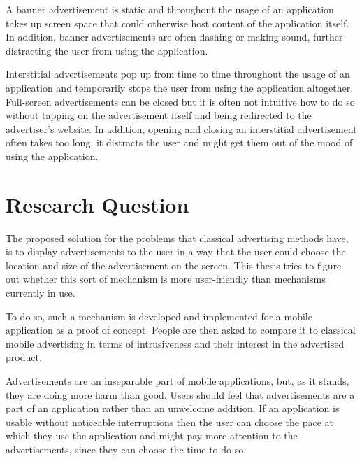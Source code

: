 A banner advertisement is static and throughout the usage of an application takes up screen space that could otherwise host content of the application itself. In addition, banner advertisements are often flashing or making sound, further distracting the user from using the application.

Interstitial advertisements pop up from time to time throughout the usage of an application and temporarily stops the user from using the application altogether. Full-screen advertisements can be closed but it is often not intuitive how to do so without tapping on the advertisement itself and being redirected to the advertiser's website. In addition, opening and closing an interstitial advertisement often takes too long. it distracts the user and might get them out of the mood of using the application.


\section{Research Question}

The proposed solution for the problems that classical advertising methods have, is to display advertisements to the user in a way that the user could choose the location and size of the advertisement on the screen. This thesis tries to figure out whether this sort of mechanism is more user-friendly than mechanisms currently in use.

To do so, such a mechanism is developed and implemented for a mobile application as a proof of concept. People are then asked to compare it to classical mobile advertising in terms of intrusiveness and their interest in the advertised product.

Advertisements are an inseparable part of mobile applications, but, as it stands, they are doing more harm than good. Users should feel that advertisements are a part of an application rather than an unwelcome addition. If an application is usable without noticeable interruptions then the user can choose the pace at which they use the application and might pay more attention to the advertisements, since they can choose the time to do so.

